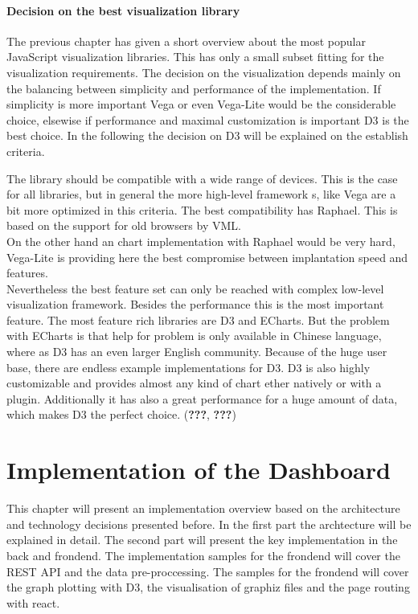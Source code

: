 \documentclass[american,a4paper,oneside,,tablecaptionabove]{scrbook}
\begin{document}
\subsubsection{Decision on the best visualization
library}\label{decision-on-the-best-visualization-library}

The previous chapter has given a short overview about the most popular
JavaScript visualization libraries. This has only a small subset fitting
for the visualization requirements. The decision on the visualization
depends mainly on the balancing between simplicity and performance of
the implementation. If simplicity is more important Vega or even
Vega-Lite would be the considerable choice, elsewise if performance and
maximal customization is important D3 is the best choice. In the
following the decision on D3 will be explained on the establish
criteria.

The library should be compatible with a wide range of devices. This is
the case for all libraries, but in general the more high-level framework
s, like Vega are a bit more optimized in this criteria. The best
compatibility has Raphael. This is based on the support for old browsers
by VML.\\
On the other hand an chart implementation with Raphael would be very
hard, Vega-Lite is providing here the best compromise between
implantation speed and features.\\
Nevertheless the best feature set can only be reached with complex
low-level visualization framework. Besides the performance this is the
most important feature. The most feature rich libraries are D3 and
ECharts. But the problem with ECharts is that help for problem is only
available in Chinese language, where as D3 has an even larger English
community. Because of the huge user base, there are endless example
implementations for D3. D3 is also highly customizable and provides
almost any kind of chart ether natively or with a plugin. Additionally
it has also a great performance for a huge amount of data, which makes
D3 the perfect choice. ({\textbf{???}}, \textbf{???})

\chapter{Implementation of the
Dashboard}\label{implementation-of-the-dashboard}

This chapter will present an implementation overview based on the
architecture and technology decisions presented before. In the first
part the archtecture will be explained in detail. The second part will
present the key implementation in the back and frondend. The
implementation samples for the frondend will cover the REST API and the
data pre-proccessing. The samples for the frondend will cover the graph
plotting with D3, the visualisation of graphiz files and the page
routing with react.
\end{document}
